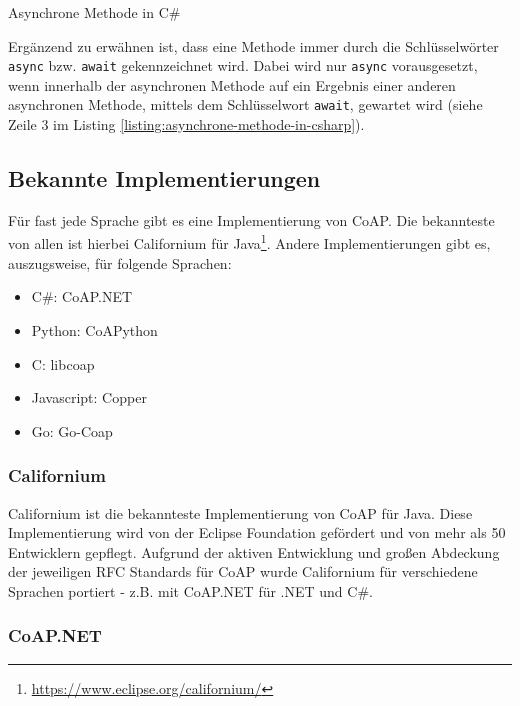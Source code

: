 \begin{listing}[H]
    \inputminted[framesep=2mm, baselinestretch=1.2, fontsize=\normalsize, linenos]{csharp}{codes/example_asynchronous.cs}
    \caption{Asynchrone Methode in C\#}
    \label{listing:asynchrone-methode-in-csharp}
\end{listing}

Ergänzend zu erwähnen ist, dass eine Methode immer durch die Schlüsselwörter \texttt{async} bzw. \texttt{await} gekennzeichnet wird. Dabei wird nur \texttt{async} vorausgesetzt, wenn innerhalb der asynchronen Methode auf ein Ergebnis einer anderen asynchronen Methode, mittels dem Schlüsselwort \texttt{await}, gewartet wird (siehe Zeile 3 im Listing \ref{listing:asynchrone-methode-in-csharp}).

\subsection{Bekannte Implementierungen}
\label{subsec:bekannte-implementierungen}

Für fast jede Sprache gibt es eine Implementierung von CoAP. Die bekannteste von allen ist hierbei Californium für Java\footnote{\href{https://www.eclipse.org/californium/}{https://www.eclipse.org/californium/}}. Andere Implementierungen gibt es, auszugsweise, für folgende Sprachen:
\begin{itemize}
    \item C\#: CoAP.NET
    \item Python: CoAPython
    \item C: libcoap
    \item Javascript: Copper
    \item Go: Go-Coap
\end{itemize}

\subsubsection{Californium}
\label{subsubsec:californium}

Californium ist die bekannteste Implementierung von CoAP für Java. Diese Implementierung wird von der Eclipse Foundation gefördert und von mehr als 50 Entwicklern gepflegt. Aufgrund der aktiven Entwicklung und großen Abdeckung der jeweiligen RFC Standards für CoAP wurde Californium für verschiedene Sprachen portiert - z.B. mit CoAP.NET für .NET und C\#.

\subsubsection{CoAP.NET}
\label{subsubsec:coap-net}

